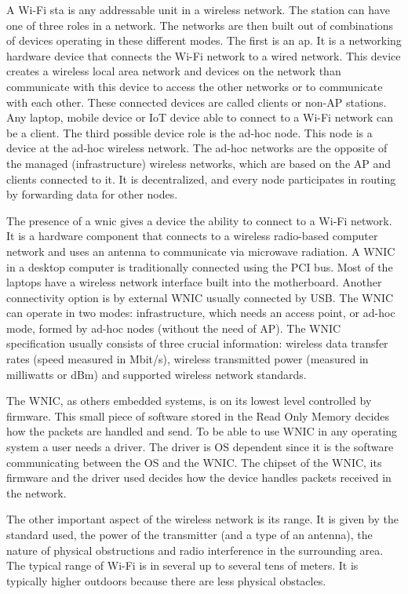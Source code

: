 A Wi-Fi \gls{sta} is any addressable unit in a wireless network. The station can have one of three roles in a network. The networks are then built out of combinations of devices operating in these different modes. The first is an \gls{ap}. It is a networking hardware device that connects the Wi-Fi network to a wired network. This device creates a wireless local area network and devices on the network than communicate with this device to access the other networks or to communicate with each other. These connected devices are called clients or non-AP stations. Any laptop, mobile device or IoT device able to connect to a Wi-Fi network can be a client. The third possible device role is the ad-hoc node. This node is a device at the ad-hoc wireless network. The ad-hoc networks are the opposite of the managed (infrastructure) wireless networks, which are based on the AP and clients connected to it. It is decentralized, and every node participates in routing by forwarding data for other nodes.

The presence of a \gls{wnic} gives a device the ability to connect to a Wi-Fi network. It is a hardware component that connects to a wireless radio-based computer network and uses an antenna to communicate via microwave radiation. A WNIC in a desktop computer is traditionally connected using the PCI bus. Most of the laptops have a wireless network interface built into the motherboard. Another connectivity option is by external WNIC usually connected by USB. The WNIC can operate in two modes: infrastructure, which needs an access point, or ad-hoc mode, formed by ad-hoc nodes (without the need of AP). The WNIC specification usually consists of three crucial information: wireless data transfer rates (speed measured in Mbit/s), wireless transmitted power (measured in milliwatts or dBm) and supported wireless network standards. 

The WNIC, as others embedded systems, is on its lowest level controlled by firmware. This small piece of software stored in the Read Only Memory decides how the packets are handled and send. To be able to use WNIC in any operating system a user needs a driver. The driver is OS dependent since it is the software communicating between the OS and the WNIC. The chipset of the WNIC, its firmware and the driver used decides how the device handles packets received in the network.

The other important aspect of the wireless network is its range. It is given by the standard used, the power of the transmitter (and a type of an antenna), the nature of physical obstructions and radio interference in the surrounding area. The typical range of Wi-Fi is in several up to several tens of meters. It is typically higher outdoors because there are less physical obstacles.  
